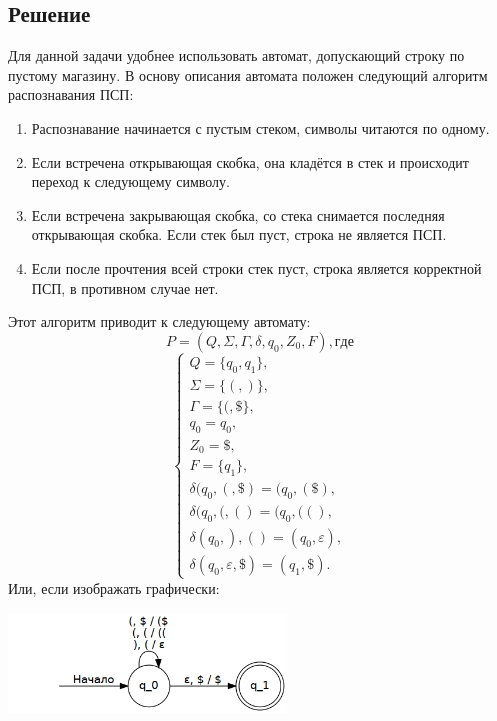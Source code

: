 \documentclass[11pt]{article}
\begin{document}
\subsection{Решение}
\label{sec:org4001261}
Для данной задачи удобнее использовать автомат, допускающий строку по пустому магазину. В
основу описания автомата положен следующий алгоритм распознавания ПСП:
\begin{enumerate}
\item Распознавание начинается с пустым стеком, символы читаются по одному.
\item Если встречена открывающая скобка, она кладётся в стек и происходит переход к следующему символу.
\item Если встречена закрывающая скобка, со стека снимается последняя открывающая скобка. Если стек был пуст, строка не является ПСП.
\item Если после прочтения всей строки стек пуст, строка является корректной ПСП, в противном случае нет.
\end{enumerate}
Этот алгоритм приводит к следующему автомату:
\begin{equation}
P = (Q, \Sigma, \Gamma, \delta, q_0, Z_0, F), где
\end{equation}
\begin{equation}
\begin{cases}
Q = \{q_0, q_1\}, \\
\Sigma = \{ (, )\}, \\
\Gamma = \{(, \$\}, \\
q_0 = q_0, \\
Z_0 = \$, \\
F = \{q_1\}, \\
\delta(q_0, (, \$) = (q_0, (\$), \\
\delta(q_0, (, () = (q_0, ((), \\
\delta(q_0, ), () = (q_0, \varepsilon), \\
\delta(q_0, \varepsilon, \$) = (q_1, \$).
\end{cases}
\end{equation}
Или, если изображать графически:
\begin{center}
\includegraphics[height=100px]{diag2.png}
\end{center}
\end{document}
